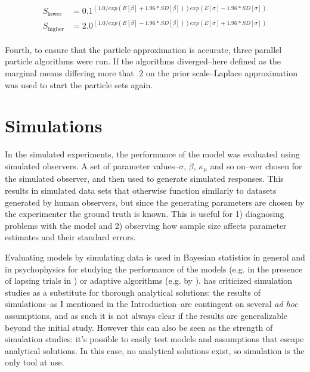 \documentclass{article}\usepackage{knitr}
\begin{document}
\begin{align}
\begin{split}
\label{eq:limits}
S_{\text{lower}} &= 0.1^{(1.0 / exp(E[\beta] + 1.96 * SD[\beta])) exp(E[\sigma] - 1.96 * SD[\sigma])}
\\ 
S_{\text{higher}} &= 2.0^ {(1.0 / exp(E[\beta] - 1.96 * SD[\beta])) exp(E[\sigma] + 1.96 * SD[\sigma])}
\end{split}
\end{align}

Fourth, to ensure that the particle approximation is accurate, three parallel particle algorithms were run. If the algorithms diverged--here defined as the marginal means differing more that $.2$ on the prior scale--Laplace approximation was used to start the particle sets again.

\newpage


\section{Simulations}
\label{sec:simulations}

In the simulated experiments, the performance of the model was evaluated using simulated observers. A set of parameter values--$\sigma$, $\beta$, $\kappa_{\mu}$ and so on--wer chosen for the simulated observer, and then used to generate simulated responses. This results in simulated data sets that otherwise function similarly to datasets generated by human observers, but since the generating parameters are chosen by the experimenter the ground truth is known. This is useful for 1) diagnosing problems with the model and 2) observing how sample size affects parameter estimates and their standard errors.

Evaluating models by simulating data is used in Bayesian statistics in general \citep[Chapter 10]{bda} and in psychophysics for studying the performance of the models (e.g. in the presence of lapsing trials in \citet{prins2012}) or adaptive algorithms (e.g. by \citet{kontsevichtyler1999}). \citet{oron2007} has criticized simulation studies as a substitute for thorough analytical solutions: the results of simulations--as I mentioned in the Introduction--are contingent on several \textit{ad hoc} assumptions, and as such it is not always clear if the results are generalizable beyond the initial study. However this can also be seen as the strength of simulation studies: it's possible to easily test models and assumptions that escape analytical solutions. In this case, no analytical solutions exist, so simulation is the only tool at use.
\end{document}
